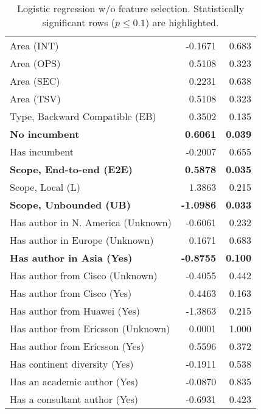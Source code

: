 \begin{table}
\begin{tabular}{lrr}
Area (INT) & -0.1671 & 0.683 \\
Area (OPS) & 0.5108 & 0.323 \\
Area (SEC) & 0.2231 & 0.638 \\
Area (TSV) & 0.5108 & 0.323 \\
Type, Backward Compatible (EB) & 0.3502 & 0.135 \\
\textbf{No incumbent} & \textbf{0.6061} & \textbf{0.039} \\
Has incumbent & -0.2007 & 0.655 \\
\textbf{Scope, End-to-end (E2E)} & \textbf{0.5878} & \textbf{0.035} \\
Scope, Local (L) & 1.3863 & 0.215 \\
\textbf{Scope, Unbounded (UB)} & \textbf{-1.0986} & \textbf{0.033} \\
Has author in N. America (Unknown) & -0.6061 & 0.232 \\
Has author in Europe (Unknown) & 0.1671 & 0.683 \\
\textbf{Has author in Asia (Yes)} & \textbf{-0.8755} & \textbf{0.100} \\
Has author from Cisco (Unknown) & -0.4055 & 0.442 \\
Has author from Cisco (Yes) & 0.4463 & 0.163 \\
Has author from Huawei (Yes) & -1.3863 & 0.215 \\
Has author from Ericsson (Unknown) & 0.0001 & 1.000 \\
Has author from Ericsson (Yes) & 0.5596 & 0.372 \\
Has continent diversity (Yes) & -0.1911 & 0.538 \\
Has an academic author (Yes) & -0.0870 & 0.835 \\
Has a consultant author (Yes) & -0.6931 & 0.423 \\
\bottomrule
\end{tabular}
\caption{Logistic regression w/o feature selection. Statistically significant rows ($p \leq 0.1$) are highlighted.}
\label{tbl:statsnofs}
\end{table}
